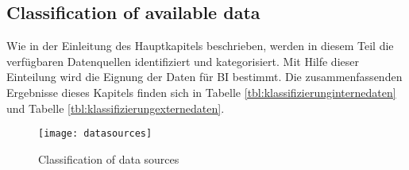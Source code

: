 \subsection{Classification of available data} \label{toc:klassifizierungderdaten}

Wie in der Einleitung des Hauptkapitels beschrieben, werden in diesem Teil die verfügbaren Datenquellen identifiziert und
kategorisiert. Mit Hilfe dieser Einteilung wird die Eignung der Daten für \ac{BI} bestimmt. Die zusammenfassenden Ergebnisse
dieses Kapitels finden sich in Tabelle \ref{tbl:klassifizierunginternedaten} und Tabelle \ref{tbl:klassifizierungexternedaten}.

\begin{figure}[H]
    \caption{Classification of data sources}
    \texttt{[image: datasources]}
    \label{figure:datasources}
    \\
    \cite[Source: Based on][Fig. 1]{hartmann2016capturing}
\end{figure}

